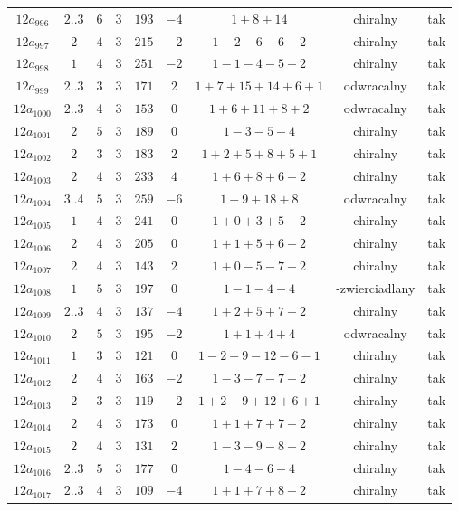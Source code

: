\begin{longtable}{ccccccccc}
$12a_{996}$ & $2..3$ & $6$ & $3$ & $193$ & $-4$ & $1+8+14$ & chiralny & tak \\
$12a_{997}$ & $2$ & $4$ & $3$ & $215$ & $-2$ & $1-2-6-6-2$ & chiralny & tak \\
$12a_{998}$ & $1$ & $4$ & $3$ & $251$ & $-2$ & $1-1-4-5-2$ & chiralny & tak \\
$12a_{999}$ & $2..3$ & $3$ & $3$ & $171$ & $2$ & $1+7+15+14+6+1$ & odwracalny & tak \\
$12a_{1000}$ & $2..3$ & $4$ & $3$ & $153$ & $0$ & $1+6+11+8+2$ & odwracalny & tak \\
$12a_{1001}$ & $2$ & $5$ & $3$ & $189$ & $0$ & $1-3-5-4$ & chiralny & tak \\
$12a_{1002}$ & $2$ & $3$ & $3$ & $183$ & $2$ & $1+2+5+8+5+1$ & chiralny & tak \\
$12a_{1003}$ & $2$ & $4$ & $3$ & $233$ & $4$ & $1+6+8+6+2$ & chiralny & tak \\
$12a_{1004}$ & $3..4$ & $5$ & $3$ & $259$ & $-6$ & $1+9+18+8$ & odwracalny & tak \\
$12a_{1005}$ & $1$ & $4$ & $3$ & $241$ & $0$ & $1+0+3+5+2$ & chiralny & tak \\
$12a_{1006}$ & $2$ & $4$ & $3$ & $205$ & $0$ & $1+1+5+6+2$ & chiralny & tak \\
$12a_{1007}$ & $2$ & $4$ & $3$ & $143$ & $2$ & $1+0-5-7-2$ & chiralny & tak \\
$12a_{1008}$ & $1$ & $5$ & $3$ & $197$ & $0$ & $1-1-4-4$ & -zwierciadlany & tak \\
$12a_{1009}$ & $2..3$ & $4$ & $3$ & $137$ & $-4$ & $1+2+5+7+2$ & chiralny & tak \\
$12a_{1010}$ & $2$ & $5$ & $3$ & $195$ & $-2$ & $1+1+4+4$ & odwracalny & tak \\
$12a_{1011}$ & $1$ & $3$ & $3$ & $121$ & $0$ & $1-2-9-12-6-1$ & chiralny & tak \\
$12a_{1012}$ & $2$ & $4$ & $3$ & $163$ & $-2$ & $1-3-7-7-2$ & chiralny & tak \\
$12a_{1013}$ & $2$ & $3$ & $3$ & $119$ & $-2$ & $1+2+9+12+6+1$ & chiralny & tak \\
$12a_{1014}$ & $2$ & $4$ & $3$ & $173$ & $0$ & $1+1+7+7+2$ & chiralny & tak \\
$12a_{1015}$ & $2$ & $4$ & $3$ & $131$ & $2$ & $1-3-9-8-2$ & chiralny & tak \\
$12a_{1016}$ & $2..3$ & $5$ & $3$ & $177$ & $0$ & $1-4-6-4$ & chiralny & tak \\
$12a_{1017}$ & $2..3$ & $4$ & $3$ & $109$ & $-4$ & $1+1+7+8+2$ & chiralny & tak \\

\end{longtable}
